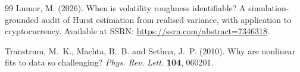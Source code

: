 \documentclass[11pt,a4paper]{article}
\numberwithin{equation}{section}
\begin{document}
\begin{thebibliography}{99}
 Lumor, M. (2026).
When is volatility roughness identifiable? A simulation-grounded audit of Hurst
estimation from realised variance, with application to cryptocurrency. Available at
SSRN: \url{https://ssrn.com/abstract=7346318}.

 Transtrum, M.~K., Machta, B.~B.
and Sethna, J.~P. (2010). Why are nonlinear fits to data so challenging?
\emph{Phys. Rev. Lett.} \textbf{104}, 060201.

\end{thebibliography}
\end{document}
